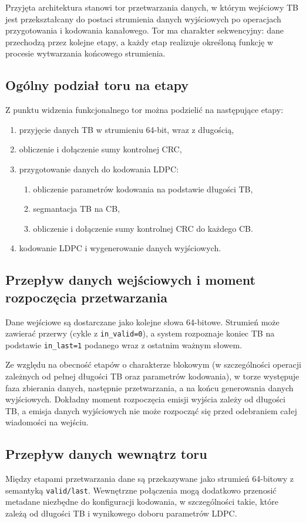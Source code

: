 Przyjęta architektura stanowi tor przetwarzania danych, w którym wejściowy TB jest przekształcany do postaci strumienia danych wyjściowych po operacjach przygotowania i kodowania kanałowego. Tor ma charakter sekwencyjny: dane przechodzą przez kolejne etapy, a każdy etap realizuje określoną funkcję w procesie wytwarzania końcowego strumienia.

\subsection{Ogólny podział toru na etapy}
Z punktu widzenia funkcjonalnego tor można podzielić na następujące etapy:
\begin{enumerate}
    \item przyjęcie danych TB w strumieniu 64-bit, wraz z długością,
    \item obliczenie i dołączenie sumy kontrolnej CRC,
    \item przygotowanie danych do kodowania LDPC:
    \begin{enumerate}
        \item obliczenie parametrów kodowania na podstawie długości TB,
        \item segmantacja TB na CB,
        \item obliczenie i dołączenie sumy kontrolnej CRC do każdego CB.
    \end{enumerate}
    \item kodowanie LDPC i wygenerowanie danych wyjściowych.
\end{enumerate}

\subsection{Przepływ danych wejściowych i moment rozpoczęcia przetwarzania}
Dane wejściowe są dostarczane jako kolejne słowa 64-bitowe. Strumień może zawierać przerwy (cykle z \texttt{in\_valid=0}), a system rozpoznaje koniec TB na podstawie \texttt{in\_last=1} podanego wraz z ostatnim ważnym słowem.

Ze względu na obecność etapów o charakterze blokowym (w szczególności operacji zależnych od pełnej długości TB oraz parametrów kodowania), w torze występuje faza zbierania danych, następnie przetwarzania, a na końcu generowania danych wyjściowych. Dokładny moment rozpoczęcia emisji wyjścia zależy od długości TB, a emisja danych wyjściowych nie może rozpocząć się przed odebraniem całej wiadomości na wejściu.

\subsection{Przepływ danych wewnątrz toru}
Między etapami przetwarzania dane są przekazywane jako strumień 64-bitowy z semantyką \texttt{valid/last}. Wewnętrzne połączenia mogą dodatkowo przenosić metadane niezbędne do konfiguracji kodowania, w szczególności takie, które zależą od długości TB i wynikowego doboru parametrów LDPC.

